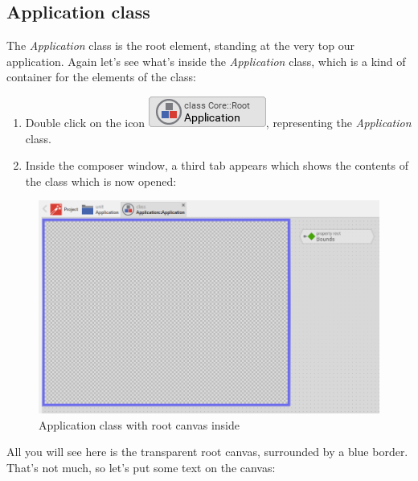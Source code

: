\documentclass[
  a4paper,
,tablecaptionabove
]{scrbook}
\begin{document}
\hypertarget{_application_class}{%
\subsection{Application class}\label{_application_class}}

The \emph{Application} class is the root element, standing at the very
top our application. Again let's see what's inside the
\emph{Application} class, which is a kind of container for the elements
of the class:

\begin{enumerate}
\def\labelenumi{\arabic{enumi}.}
\item
  Double click on the icon
  \includegraphics{./../asciidoc/modules/ROOT/assets/images/icons/ApplicationClassIcon.png},
  representing the \emph{Application} class.
\item
  Inside the composer window, a third tab appears which shows the
  contents of the class which is now opened:
\end{enumerate}

\begin{figure}
\centering
\includegraphics{./../asciidoc/modules/ROOT/assets/images/helloworld/ApplicationClass.png}
\caption{Application class with root canvas inside}
\end{figure}

All you will see here is the transparent root canvas, surrounded by a
blue border. That's not much, so let's put some text on the canvas:
\end{document}
